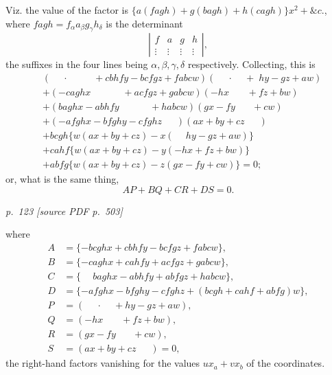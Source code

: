 \documentclass[11pt,a4paper]{article}
\newcommand{\sourcepage}[2]{%
  \bigskip
  \noindent\textit{p.~#1 [source PDF p.~#2]}%
  \par\smallskip
}
\newcommand{\sym}[1]{\mathit{#1}}
\newcommand{\surf}[1]{\par\smallskip\noindent{\itshape \{Surface $#1$.\}}\par\smallskip}
\begin{document}
Viz. the value of the factor is
$\{a(\sym{fagh})+g(\sym{bagh})+h(\sym{cagh})\}x^2+\&c.$, where
$\sym{fagh}=f_\alpha a_\beta g_\gamma h_\delta$ is the determinant
\[
\left|\begin{array}{cccc}
f&a&g&h\\
\vdots&\vdots&\vdots&\vdots
\end{array}\right|,
\]
the suffixes in the four lines being $\alpha,\beta,\gamma,\delta$ respectively.
Collecting, this is
\[
\begin{aligned}
&(\phantom{-}\cdot\phantom{caghx}+ \sym{cbhf}y-\sym{bcfg}z+\sym{fabc}w)
  (\phantom{-}\cdot\phantom{hx}+\;hy-gz+aw)\\
&+(-\sym{cagh}x\phantom{+cahfy}+\sym{acfg}z+\sym{gabc}w)
  (-hx\phantom{+hy}+fz+bw)\\
&+(\sym{bagh}x-\sym{abhf}y\phantom{+abfgz}+\sym{habc}w)
  (gx-fy\phantom{+fz}+cw)\\
&+(-\sym{afgh}x-\sym{bfgh}y-\sym{cfgh}z\phantom{+w})
  (ax+by+cz\phantom{+w})\\
&+\sym{bcgh}\{w(ax+by+cz)-x(\phantom{-}hy-gz+aw)\}\\
&+\sym{cahf}\{w(ax+by+cz)-y(-hx+fz+bw)\}\\
&+\sym{abfg}\{w(ax+by+cz)-z(gx-fy+cw)\}=0;
\end{aligned}
\]
or, what is the same thing,
\[
AP+BQ+CR+DS=0.
\]
\surf{abcd\alpha\beta}

\sourcepage{123}{503}
where
\[
\begin{aligned}
A&=\{-\sym{bcgh}x+\sym{cbhf}y-\sym{bcfg}z+\sym{fabc}w\},\\
B&=\{-\sym{cagh}x+\sym{cahf}y+\sym{acfg}z+\sym{gabc}w\},\\
C&=\{\phantom{-}\sym{bagh}x-\sym{abhf}y+\sym{abfg}z+\sym{habc}w\},\\
D&=\{-\sym{afgh}x-\sym{bfgh}y-\sym{cfgh}z
       +(\sym{bcgh}+\sym{cahf}+\sym{abfg})w\},\\
P&=(\phantom{-}\cdot\phantom{hx}+hy-gz+aw),\\
Q&=(-hx\phantom{+hy}+fz+bw),\\
R&=(gx-fy\phantom{+fz}+cw),\\
S&=(ax+by+cz\phantom{+w})=0,
\end{aligned}
\]
the right-hand factors vanishing for the values $ux_a+vx_b$ of the coordinates.
\end{document}
